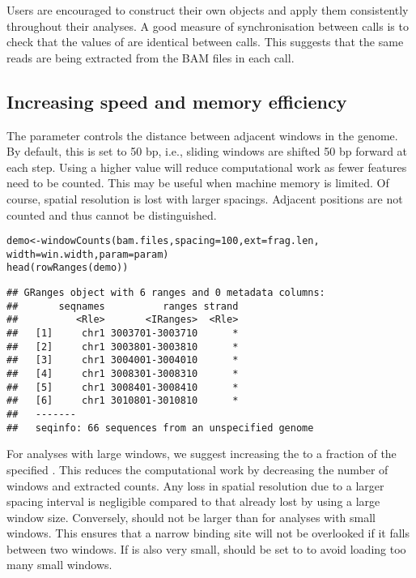 \documentclass{report}\usepackage[]{graphicx}\usepackage[usenames,dvipsnames]{color}
\newcommand{\hlnum}[1]{\textcolor[rgb]{0.816,0.125,0.439}{#1}}%
\newcommand{\hlstd}[1]{\textcolor[rgb]{0.251,0.251,0.251}{#1}}%
\newcommand{\hlkwb}[1]{\textcolor[rgb]{0,0,0}{#1}}%
\newcommand{\hlkwc}[1]{\textcolor[rgb]{0.251,0.251,0.251}{#1}}%
\newcommand{\hlkwd}[1]{\textcolor[rgb]{0.878,0.439,0.125}{#1}}%
\newenvironment{knitrout}{}{} %
\begin{document}
Users are encouraged to construct their own  objects and apply them consistently throughout their analyses.
A good measure of synchronisation between  calls is to check that the values of  are identical between calls. 
This suggests that the same reads are being extracted from the BAM files in each call. 

\subsection{Increasing speed and memory efficiency}
\label{sec:efficiency}
The  parameter controls the distance between adjacent windows in the genome.
By default, this is set to 50 bp, i.e., sliding windows are shifted 50 bp forward at each step.
Using a higher value will reduce computational work as fewer features need to be counted.
This may be useful when machine memory is limited. 
Of course, spatial resolution is lost with larger spacings.
Adjacent positions are not counted and thus cannot be distinguished. 

\begin{knitrout}
\color{fgcolor}\begin{kframe}
\begin{alltt}
\hlstd{demo} \hlkwb{<-} \hlkwd{windowCounts}\hlstd{(bam.files,} \hlkwc{spacing}\hlstd{=}\hlnum{100}\hlstd{,} \hlkwc{ext}\hlstd{=frag.len,}
                     \hlkwc{width}\hlstd{=win.width,} \hlkwc{param}\hlstd{=param)}
\hlkwd{head}\hlstd{(}\hlkwd{rowRanges}\hlstd{(demo))}
\end{alltt}
\begin{verbatim}
## GRanges object with 6 ranges and 0 metadata columns:
##       seqnames          ranges strand
##          <Rle>       <IRanges>  <Rle>
##   [1]     chr1 3003701-3003710      *
##   [2]     chr1 3003801-3003810      *
##   [3]     chr1 3004001-3004010      *
##   [4]     chr1 3008301-3008310      *
##   [5]     chr1 3008401-3008410      *
##   [6]     chr1 3010801-3010810      *
##   -------
##   seqinfo: 66 sequences from an unspecified genome
\end{verbatim}
\end{kframe}
\end{knitrout}

For analyses with large windows, we suggest increasing the  to a fraction of the specified . 
This reduces the computational work by decreasing the number of windows and extracted counts. 
Any loss in spatial resolution due to a larger spacing interval is negligible compared to that already lost by using a large window size. 
Conversely,  should not be larger than  for analyses with small windows.
This ensures that a narrow binding site will not be overlooked if it falls between two windows.
If  is also very small,  should be set to  to avoid loading too many small windows.
\end{document}
